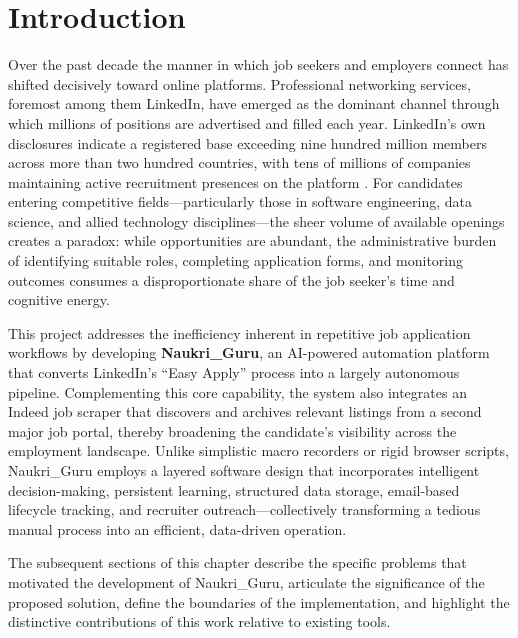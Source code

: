 \documentclass[12pt, a4paper, oneside]{report}
\begin{document}
\clearpage
{}
\setcounter{page}{1}

\chapter{Introduction}
\label{chap:introduction}

Over the past decade the manner in which job seekers and employers connect has shifted decisively toward online platforms. Professional networking services, foremost among them LinkedIn, have emerged as the dominant channel through which millions of positions are advertised and filled each year. LinkedIn's own disclosures indicate a registered base exceeding nine hundred million members across more than two hundred countries, with tens of millions of companies maintaining active recruitment presences on the platform \cite{ref1}. For candidates entering competitive fields---particularly those in software engineering, data science, and allied technology disciplines---the sheer volume of available openings creates a paradox: while opportunities are abundant, the administrative burden of identifying suitable roles, completing application forms, and monitoring outcomes consumes a disproportionate share of the job seeker's time and cognitive energy.

This project addresses the inefficiency inherent in repetitive job application workflows by developing \textbf{Naukri\_Guru}, an AI-powered automation platform that converts LinkedIn's ``Easy Apply'' process into a largely autonomous pipeline. Complementing this core capability, the system also integrates an Indeed job scraper that discovers and archives relevant listings from a second major job portal, thereby broadening the candidate's visibility across the employment landscape. Unlike simplistic macro recorders or rigid browser scripts, Naukri\_Guru employs a layered software design that incorporates intelligent decision-making, persistent learning, structured data storage, email-based lifecycle tracking, and recruiter outreach---collectively transforming a tedious manual process into an efficient, data-driven operation.

The subsequent sections of this chapter describe the specific problems that motivated the development of Naukri\_Guru, articulate the significance of the proposed solution, define the boundaries of the implementation, and highlight the distinctive contributions of this work relative to existing tools.
\end{document}

